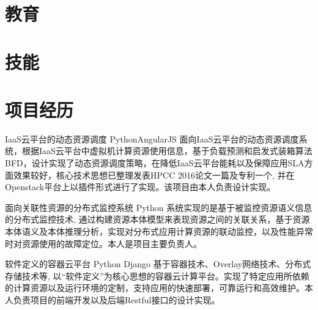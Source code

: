 \documentclass[11pt,a4paper]{moderncv}
\title{}               %
\begin{document}
\maketitle

\vspace*{-3mm}

\section{教育}

\vspace*{-1mm}

\section{技能}

\vspace*{-1mm}

\section{项目经历}
\renewcommand{\baselinestretch}{1.2}

{IaaS云平台的动态资源调度}
{Python}{AngularJS}{}
{面向IaaS云平台的动态资源调度系统，根据IaaS云平台中虚拟机计算资源使用信息，基于负载预测和启发式装箱算法BFD，设计实现了动态资源调度策略，在降低IaaS云平台能耗以及保障应用SLA方面效果较好，核心技术思想已整理发表HPCC 2016论文一篇及专利一个, 并在Openstack平台上以插件形式进行了实现。该项目由本人负责设计实现。}

\vspace*{0.2\baselineskip}
{面向关联性资源的分布式监控系统}
{Python}
{}{}
{系统实现的是基于被监控资源语义信息的分布式监控技术, 通过构建资源本体模型来表现资源之间的关联关系，基于资源本体语义及本体推理分析，实现对分布式应用计算资源的联动监控，以及性能异常时对资源使用的故障定位。本人是项目主要负责人。}

\vspace*{0.2\baselineskip}
{软件定义的容器云平台}
{Python}
{Django}{}
{基于容器技术、Overlay网络技术、分布式存储技术等, 以“软件定义”为核心思想的容器云计算平台。实现了特定应用所依赖的计算资源以及运行环境的定制，支持应用的快速部署，可靠运行和高效维护。本人负责项目的前端开发以及后端Restful接口的设计实现。}
\vspace*{0.2\baselineskip}
\end{document}
